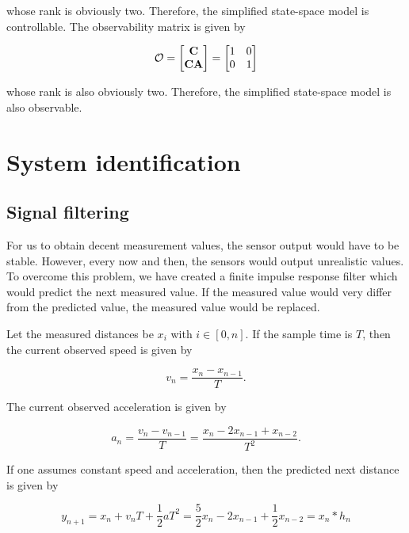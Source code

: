 \documentclass[11pt,titlepage]{report}
\begin{document}
whose rank is obviously two. Therefore, the simplified state-space model is controllable. The observability matrix is given by

\begin{equation}
	\mathcal{O} = \begin{bmatrix}
		\mathbf{C} \\
		\mathbf{C} \mathbf{A}
	\end{bmatrix} = \begin{bmatrix}
		1 & 0 \\
		0 & 1
	\end{bmatrix}
\end{equation}

whose rank is also obviously two. Therefore, the simplified state-space model is also observable.

\section{System identification}
\subsection{Signal filtering}
For us to obtain decent measurement values, the sensor output would have to be stable. However, every now and then, the sensors would output unrealistic values. To overcome this problem, we have created a finite impulse response filter which would predict the next measured value. If the measured value would very differ from the predicted value, the measured value would be replaced.

Let the measured distances be $x_i$ with $i \in [0,n]$. If the sample time is $T$, then the current observed speed is given by

\begin{equation}
	v_n = \frac{x_{n} - x_{n-1}}{T}.
\end{equation}

The current observed acceleration is given by

\begin{equation}
	a_n = \frac{v_n - v_{n-1}}{T} = \frac{x_{n} - 2 x_{n-1} + x_{n-2}}{T^2}.
\end{equation}

If one assumes constant speed and acceleration, then the predicted next distance is given by

\begin{equation}
	y_{n+1} = x_{n} + v_n T + \frac{1}{2} a T^2 = \frac{5}{2} x_n - 2 x_{n-1} + \frac{1}{2} x_{n-2}= x_n \ast h_n
\end{equation}
\end{document}
